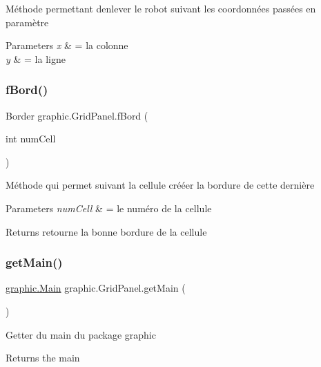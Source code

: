 Méthode permettant d\textquotesingle{}enlever le robot suivant les coordonnées passées en paramètre 
\begin{DoxyParams}{Parameters}
{\em x} & = la colonne \\
\hline
{\em y} & = la ligne \\
\hline
\end{DoxyParams}
\hypertarget{classgraphic_1_1_grid_panel_ad1d3cae8c7aef1a90c84c74daa07ede3}{}\label{classgraphic_1_1_grid_panel_ad1d3cae8c7aef1a90c84c74daa07ede3} 
\subsubsection{\texorpdfstring{f\+Bord()}{fBord()}}
{\footnotesize\ttfamily Border graphic.\+Grid\+Panel.\+f\+Bord (\begin{DoxyParamCaption}\item[{int}]{num\+Cell }\end{DoxyParamCaption})}

Méthode qui permet suivant la cellule crééer la bordure de cette dernière 
\begin{DoxyParams}{Parameters}
{\em num\+Cell} & = le numéro de la cellule \\
\hline
\end{DoxyParams}
\begin{DoxyReturn}{Returns}
retourne la bonne bordure de la cellule 
\end{DoxyReturn}
\hypertarget{classgraphic_1_1_grid_panel_aef759da0374166debd9b42682d17ff5f}{}\label{classgraphic_1_1_grid_panel_aef759da0374166debd9b42682d17ff5f} 
\subsubsection{\texorpdfstring{get\+Main()}{getMain()}}
{\footnotesize\ttfamily \hyperlink{classgraphic_1_1_main}{graphic.\+Main} graphic.\+Grid\+Panel.\+get\+Main (\begin{DoxyParamCaption}{ }\end{DoxyParamCaption})}

Getter du main du package graphic \begin{DoxyReturn}{Returns}
the main 
\end{DoxyReturn}
\hypertarget{classgraphic_1_1_grid_panel_a3ac9e3dc1d58bee96e2d8c93582542f8}{}\label{classgraphic_1_1_grid_panel_a3ac9e3dc1d58bee96e2d8c93582542f8} 
